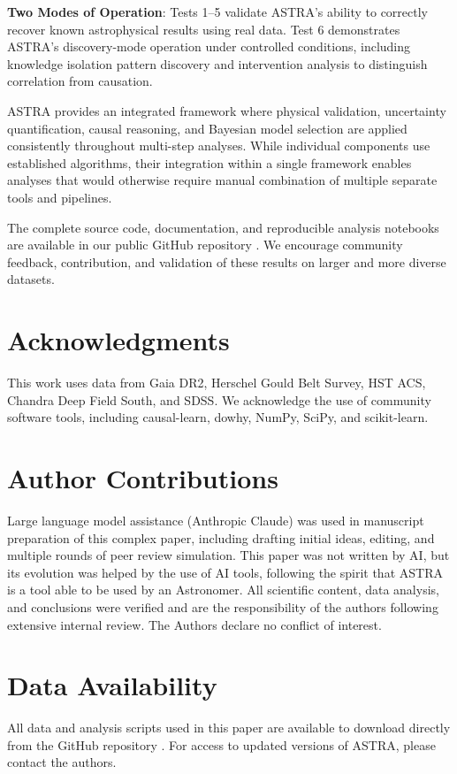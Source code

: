 \documentclass[usenatbib]{rasti}
\begin{document}
\textbf{Two Modes of Operation}: Tests 1--5 validate ASTRA's ability to correctly recover known astrophysical results using real data. Test 6 demonstrates ASTRA's discovery-mode operation under controlled conditions, including knowledge isolation pattern discovery and intervention analysis to distinguish correlation from causation.

ASTRA provides an integrated framework where physical validation, uncertainty quantification, causal reasoning, and Bayesian model selection are applied consistently throughout multi-step analyses. While individual components use established algorithms, their integration within a single framework enables analyses that would otherwise require manual combination of multiple separate tools and pipelines.

The complete source code, documentation, and reproducible analysis notebooks are available in our public GitHub repository \cite{astra_github}. We encourage community feedback, contribution, and validation of these results on larger and more diverse datasets.

\section*{Acknowledgments}

This work uses data from Gaia DR2, Herschel Gould Belt Survey, HST ACS, Chandra Deep Field South, and SDSS. We acknowledge the use of community software tools, including causal-learn, dowhy, NumPy, SciPy, and scikit-learn.

\section*{Author Contributions}

Large language model assistance (Anthropic Claude) was used in manuscript preparation of this complex paper, including drafting initial ideas, editing, and multiple rounds of peer review simulation. This paper was not written by AI, but its evolution was helped by the use of AI tools, following the spirit that ASTRA is a tool able to be used by an Astronomer. All scientific content, data analysis, and conclusions were verified and are the responsibility of the authors following extensive internal review. The Authors declare no conflict of interest.

\section*{Data Availability}

All data and analysis scripts used in this paper are available to download directly from the GitHub repository \cite{astra_github}. For access to updated versions of ASTRA, please contact the authors.

\label{lastpage}



\end{document}
